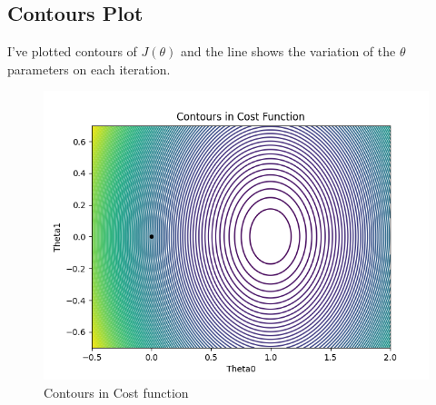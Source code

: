 \documentclass[12pt]{article}
\begin{document}
\subsection{Contours Plot} I've plotted contours of $J(\theta)$ and the line shows the variation of the $\theta$ parameters on each iteration.\\
\begin{figure}[h]
  \includegraphics[width=\linewidth]{contourPlot.png}
  \caption{Contours in Cost function}
  \label{fig1C}
\end{figure}
\end{document}
